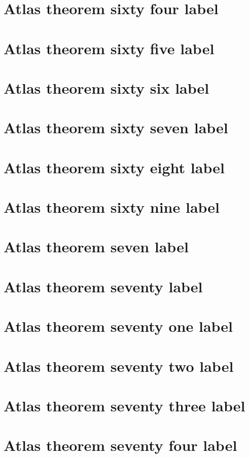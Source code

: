 \documentclass[11pt]{article}
\theoremstyle{definition}
\begin{document}
\section{Atlas theorem sixty four label}
\label{ll:labels:atlas-t64}
\section{Atlas theorem sixty five label}
\label{ll:labels:atlas-t65}
\section{Atlas theorem sixty six label}
\label{ll:labels:atlas-t66}
\section{Atlas theorem sixty seven label}
\label{ll:labels:atlas-t67}
\section{Atlas theorem sixty eight label}
\label{ll:labels:atlas-t68}
\section{Atlas theorem sixty nine label}
\label{ll:labels:atlas-t69}
\section{Atlas theorem seven label}
\label{ll:labels:atlas-t7}
\section{Atlas theorem seventy label}
\label{ll:labels:atlas-t70}
\section{Atlas theorem seventy one label}
\label{ll:labels:atlas-t71}
\section{Atlas theorem seventy two label}
\label{ll:labels:atlas-t72}
\section{Atlas theorem seventy three label}
\label{ll:labels:atlas-t73}
\section{Atlas theorem seventy four label}
\label{ll:labels:atlas-t74}
\end{document}
